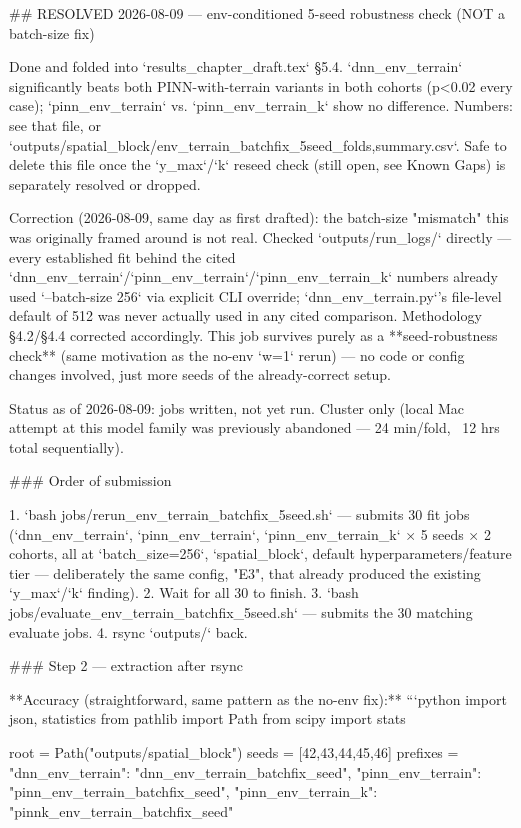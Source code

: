 ## RESOLVED 2026-08-09 — env-conditioned 5-seed robustness check (NOT a batch-size fix)

Done and folded into `results_chapter_draft.tex` §5.4. `dnn_env_terrain` significantly beats both
PINN-with-terrain variants in both cohorts (p<0.02 every case); `pinn_env_terrain` vs.
`pinn_env_terrain_k` show no difference. Numbers: see that file, or
`outputs/spatial_block/env_terrain_batchfix_5seed_{folds,summary}.csv`. Safe to delete this file
once the `y_max`/`k` reseed check (still open, see Known Gaps) is separately resolved or dropped.

Correction (2026-08-09, same day as first drafted): the batch-size "mismatch" this was originally
framed around is not real. Checked `outputs/run_logs/` directly — every established fit behind the
cited `dnn_env_terrain`/`pinn_env_terrain`/`pinn_env_terrain_k` numbers already used
`--batch-size 256` via explicit CLI override; `dnn_env_terrain.py`'s file-level default of 512 was
never actually used in any cited comparison. Methodology §4.2/§4.4 corrected accordingly. This job
survives purely as a **seed-robustness check** (same motivation as the no-env `w=1` rerun) — no
code or config changes involved, just more seeds of the already-correct setup.

Status as of 2026-08-09: jobs written, not yet run. Cluster only (local Mac attempt at this
model family was previously abandoned — 24 min/fold, ~12 hrs total sequentially).

### Order of submission

1. `bash jobs/rerun_env_terrain_batchfix_5seed.sh` — submits 30 fit jobs
   (`dnn_env_terrain`, `pinn_env_terrain`, `pinn_env_terrain_k` × 5 seeds × 2 cohorts,
   all at `batch_size=256`, `spatial_block`, default hyperparameters/feature tier — deliberately
   the same config, "E3", that already produced the existing `y_max`/`k` finding).
2. Wait for all 30 to finish.
3. `bash jobs/evaluate_env_terrain_batchfix_5seed.sh` — submits the 30 matching evaluate jobs.
4. rsync `outputs/` back.

### Step 2 — extraction after rsync

**Accuracy (straightforward, same pattern as the no-env fix):**
```python
import json, statistics
from pathlib import Path
from scipy import stats

root = Path("outputs/spatial_block")
seeds = [42,43,44,45,46]
prefixes = {"dnn_env_terrain": "dnn_env_terrain_batchfix_seed",
            "pinn_env_terrain": "pinn_env_terrain_batchfix_seed",
            "pinn_env_terrain_k": "pinnk_env_terrain_batchfix_seed"}

